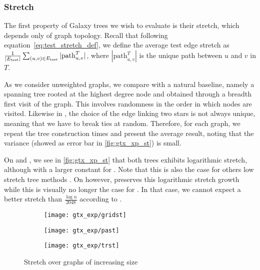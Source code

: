 \subsubsection{Stretch}

The first property of Galaxy trees we wish to evaluate is their stretch, which depends only of graph
topology. Recall that following equation~\autoref{eq:test_stretch_def}, we define the average test
edge stretch as $\frac{1}{|E_{\mathrm{test}}{}|} \sum_{(u,v) \in E_{\mathrm{test}}{}} |\mathrm{path}^T_{u,v}|$,
where $|\mathrm{path}^T_{u,v}|$ is the unique path between $u$ and $v$ in $T$.

As we consider unweighted graphs, we compare \gtx{} with a natural baseline, namely a spanning tree
rooted at the highest degree node and obtained through a breadth first visit of the graph. This
involves randomness in the order in which nodes are visited. Likewise in \gtx{}, the choice of the edge
linking two stars is not always unique, meaning that we have to break ties at random.  Therefore,
for each graph, we repeat the tree construction  times and present the average result, noting that
the variance (showed as error bar in \autoref{fig:gtx_xp_st}) is small.

On \lpa{} and \triangle{}, we see in \autoref{fig:gtx_xp_st} that both trees exhibits logarithmic stretch, although with a
larger constant for \gtx{}. Note that this is also the case for others low stretch tree methods
\autocite[Section 5.3.1]{papplow}. On \grid{} however, \gtx{} preserves this logarithmic stretch growth
while this is visually no longer the case for \bfs{}.
In that case, we cannot expect a better stretch than $\frac{\log n}{2048}$ according to
\autocite[Theorem 6.6]{LowerBound95}.

\begin{figure}[tbh]
	\centering
	\begin{subfigure}[b]{0.9\textwidth}
		\texttt{[image: gtx\_exp/gridst]}
		\caption{\grid{} }\label{fig:gtx_xp_gridst}
	\end{subfigure}

	\begin{subfigure}[b]{0.9\textwidth}
		\texttt{[image: gtx\_exp/past]}
		\caption{\lpa{} }\label{fig:gtx_xp_past}
	\end{subfigure}

	\begin{subfigure}[b]{0.9\textwidth}
		\texttt{[image: gtx\_exp/trst]}
		\caption{\triangle{} }\label{fig:gtx_xp_trst}
	\end{subfigure}
	\caption{Stretch over graphs of increasing size}\label{fig:gtx_xp_st}
\end{figure}

